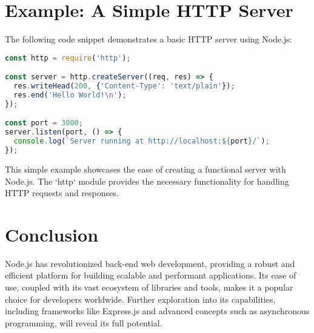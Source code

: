 \documentclass{article}
\begin{document}
\section{Example: A Simple HTTP Server}

The following code snippet demonstrates a basic HTTP server using Node.js:

\begin{lstlisting}[language=JavaScript, caption=Simple HTTP Server in Node.js, basicstyle=\ttfamily\footnotesize]
const http = require('http');

const server = http.createServer((req, res) => {
  res.writeHead(200, {'Content-Type': 'text/plain'});
  res.end('Hello World!\n');
});

const port = 3000;
server.listen(port, () => {
  console.log(`Server running at http://localhost:${port}/`);
});
\end{lstlisting}

This simple example showcases the ease of creating a functional server with Node.js.  The `http` module provides the necessary functionality for handling HTTP requests and responses.

\section{Conclusion}

Node.js has revolutionized back-end web development, providing a robust and efficient platform for building scalable and performant applications. Its ease of use, coupled with its vast ecosystem of libraries and tools, makes it a popular choice for developers worldwide.  Further exploration into its capabilities, including frameworks like Express.js and advanced concepts such as asynchronous programming, will reveal its full potential.
\end{document}
